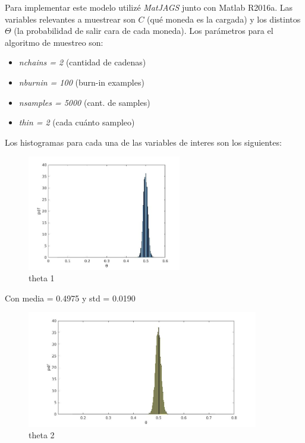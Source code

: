 Para implementar este modelo utilizé \textit{MatJAGS} junto con Matlab R2016a. Las variables relevantes a muestrear son $C$ (qué moneda es la cargada) y los distintos $\Theta$ (la probabilidad
de salir cara de cada moneda). Los parámetros para el algoritmo de muestreo son: 

\begin{itemize}
 \item \textit{nchains = 2} (cantidad de cadenas)
 \item \textit{nburnin = 100} (burn-in examples)
 \item \textit{nsamples = 5000} (cant. de samples)
 \item \textit{thin = 2} (cada cuánto sampleo)
\end{itemize}

Los histogramas para cada una de las variables de interes son los siguientes:


\begin{figure}[h!]
  \centering
    \includegraphics[width=0.6\textwidth]{imagenes/theta1.jpg}
  \caption{theta 1}
\end{figure}

Con media = 0.4975 y std = 0.0190

\newpage 

\begin{figure}[h]
    \includegraphics[width=0.9\textwidth]{imagenes/theta2.jpg}
  \caption{theta 2}
\end{figure}

